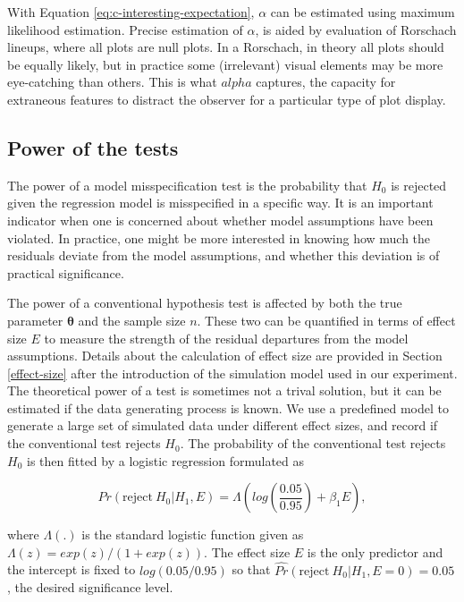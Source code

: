 \documentclass[]{interact}
\theoremstyle{plain}%
\theoremstyle{definition}
\theoremstyle{remark}
\begin{document}
With Equation \ref{eq:c-interesting-expectation}, \(\alpha\) can be
estimated using maximum likelihood estimation. Precise estimation of
\(\alpha\), is aided by evaluation of Rorschach lineups, where all plots
are null plots. In a Rorschach, in theory all plots should be equally
likely, but in practice some (irrelevant) visual elements may be more
eye-catching than others. This is what \(alpha\) captures, the capacity
for extraneous features to distract the observer for a particular type
of plot display.

\hypertarget{power-of-the-tests}{%
\subsection{Power of the tests}\label{power-of-the-tests}}

The power of a model misspecification test is the probability that
\(H_0\) is rejected given the regression model is misspecified in a
specific way. It is an important indicator when one is concerned about
whether model assumptions have been violated. In practice, one might be
more interested in knowing how much the residuals deviate from the model
assumptions, and whether this deviation is of practical significance.

The power of a conventional hypothesis test is affected by both the true
parameter \(\boldsymbol{\theta}\) and the sample size \(n\). These two
can be quantified in terms of effect size \(E\) to measure the strength
of the residual departures from the model assumptions. Details about the
calculation of effect size are provided in Section \ref{effect-size}
after the introduction of the simulation model used in our experiment.
The theoretical power of a test is sometimes not a trival solution, but
it can be estimated if the data generating process is known. We use a
predefined model to generate a large set of simulated data under
different effect sizes, and record if the conventional test rejects
\(H_0\). The probability of the conventional test rejects \(H_0\) is
then fitted by a logistic regression formulated as

\begin{equation} \label{eq:logistic-regression-1-1}
Pr(\text{reject}~H_0|H_1,E) = \Lambda\left(log\left(\frac{0.05}{0.95}\right) + \beta_1 E\right),
\end{equation}

\noindent where \(\Lambda(.)\) is the standard logistic function given
as \(\Lambda(z) = exp(z)/(1+exp(z))\). The effect size \(E\) is the only
predictor and the intercept is fixed to \(log(0.05/0.95)\) so that
\(\hat{Pr}(\text{reject}~H_0|H_1,E = 0) = 0.05\), the desired
significance level.
\end{document}
